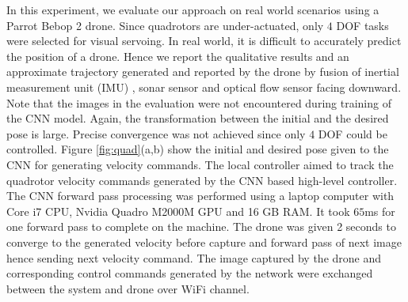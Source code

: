 \documentclass[usletter, 10 pt, conference]{ieeeconf}  %
\begin{document}
In this experiment, we evaluate our approach on real world scenarios using a Parrot Bebop 2 drone. Since quadrotors are under-actuated, only $4$ DOF tasks were selected for visual servoing. In real world, it is difficult to accurately predict the position of a drone. Hence we report the qualitative results and an approximate trajectory generated and reported by the drone by fusion of inertial measurement unit (IMU) , sonar sensor and optical flow sensor facing downward. Note that the images in the evaluation were not encountered during training of the CNN model. Again, the transformation between the initial and the desired pose is large. Precise convergence was not achieved since only $4$ DOF could be controlled. Figure \ref{fig:quad}(a,b) show the initial and desired pose given to the CNN for generating velocity commands. The local controller aimed to track the quadrotor velocity commands generated by the CNN based  high-level controller. The CNN forward pass processing was performed using a laptop computer with Core i7 CPU, Nvidia Quadro M2000M GPU and 16 GB RAM. It took $65$ms for one forward pass to complete on the machine. The drone was given 2 seconds to converge to the generated velocity before capture and forward pass of next image hence sending next velocity command. The image captured by the drone and corresponding control commands generated by the network were exchanged between the system and drone over WiFi channel.
\end{document}
